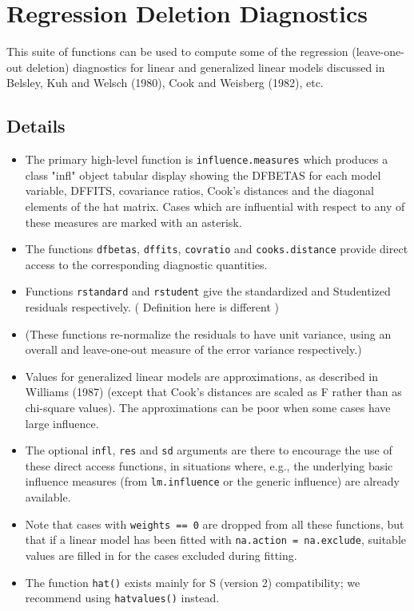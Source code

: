 \documentclass[residuals.tex]{subfiles}
\begin{document}
\Large

\section{Regression Deletion Diagnostics}

This suite of functions can be used to compute some of the regression (leave-one-out deletion) diagnostics for linear and generalized linear models discussed in Belsley, Kuh and Welsch (1980), Cook and Weisberg (1982), etc.

\subsection*{Details}
\begin{itemize}
	\item The primary high-level function is \texttt{influence.measures} which produces a class "infl" object tabular display showing the DFBETAS for each model variable, DFFITS, covariance ratios, Cook's distances and the diagonal elements of the hat matrix. Cases which are influential with respect to any of these measures are marked with an asterisk. 
	
	\item The functions \texttt{dfbetas}, \texttt{dffits}, \texttt{covratio} and \texttt{cooks.distance} provide direct access to the corresponding diagnostic quantities. 
	
	\item Functions \texttt{rstandard} and \texttt{rstudent} give the standardized and Studentized residuals respectively. 
	( Definition here is different )
	\item (These functions re-normalize the residuals to have unit variance, using an overall and leave-one-out measure of the error variance respectively.) 
	
	\item Values for generalized linear models are approximations, as described in Williams (1987) (except that Cook's distances are scaled as F rather than as chi-square values). The approximations can be poor when some cases have large influence. 
	
	\item The optional i\texttt{nfl}, \texttt{res} and \texttt{sd} arguments are there to encourage the use of these direct access functions, in situations where, e.g., the underlying basic influence measures (from \texttt{lm.influence} or the generic influence) are already available. 
	
	\item Note that cases with \texttt{weights == 0} are dropped from all these functions, but that if a linear model has been fitted with \texttt{na.action = na.exclude}, suitable values are filled in for the cases excluded during fitting. 
	
	\item 
	The function \texttt{hat()} exists mainly for S (version 2) compatibility; we recommend using \texttt{hatvalues()} instead. 
\end{itemize}
 
\end{document}
